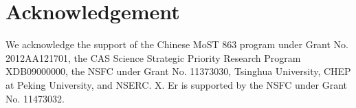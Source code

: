 \documentclass[aps,prd,twocolumn,showpacs,superscriptaddress,groupedaddress,nofootinbib]{revtex4}  %
\begin{document}
\section{Acknowledgement}
We acknowledge the support of the Chinese MoST 863 program under Grant 
No. 2012AA121701, the CAS Science Strategic Priority Research Program 
XDB09000000, the NSFC under Grant No. 11373030, Tsinghua University, 
CHEP at Peking University, and NSERC. 
X. Er is supported by the NSFC under Grant No. 11473032.



\end{document}

